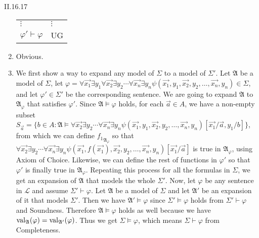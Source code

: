 \documentclass[12pt]{article}
\begin{document}
\begin{customthm}{II.16.17}
\begin{enumerate}
\begin{center}
\begin{tabular}{ll}
        $\vdots$ & $\vdots$ \\
        $\varphi'\vdash\varphi$ & UG \\
      \end{tabular}
    \end{center}
    \item Obvious.
    \item We first show a way to expand any model of $\Sigma$ to a model of $\Sigma'$. Let $\mathfrak{A}$ be a model of $\Sigma$, let $\varphi=\forall\vec{x_1}\exists y_1\forall\vec{x_2}\exists y_2\cdots\forall\vec{x_n}\exists y_n\psi(\vec{x_1},y_1,\vec{x_2},y_2,\ldots,\vec{x_n},y_n)\in\Sigma$, and let $\varphi'\in\Sigma'$ be the corresponding sentence. We are going to expand $\mathfrak{A}$ to $\mathfrak{A}_\varphi$ that satisfies $\varphi'$. Since $\mathfrak{A}\models\varphi$ holds, for each $\vec{a}\in A$, we have a non-empty subset $S_{\vec{a}}=\{b\in A:\mathfrak{A}\models\forall\vec{x_2}\exists y_2\cdots\forall\vec{x_n}\exists y_n\psi(\vec{x_1},y_1,\vec{x_2},y_2,\ldots,\vec{x_n},y_n)[\vec{x_1}/\vec{a},y_1/b]\}$, from which we can define ${f_1}_{\mathfrak{A}_\varphi}$ so that $\forall\vec{x_2}\exists y_2\cdots\forall\vec{x_n}\exists y_n\psi(\vec{x_1},f(\vec{x_1}),\vec{x_2},y_2,\ldots,\vec{x_n},y_n)[\vec{x_1}/\vec{a}]$ is true in $\mathfrak{A}_\varphi$, using Axiom of Choice. Likewise, we can define the rest of functions in $\varphi'$ so that $\varphi'$ is finally true in $\mathfrak{A}_\varphi$. Repeating this process for all the formulas in $\Sigma$, we get an expansion of $\mathfrak{A}$ that models the whole $\Sigma'$. Now, let $\varphi$ be any sentence in $\mathcal{L}$ and assume $\Sigma'\vdash\varphi$. Let $\mathfrak{A}$ be a model of $\Sigma$ and let $\mathfrak{A}'$ be an expansion of it that models $\Sigma'$. Then we have $\mathfrak{A}'\models\varphi$ since $\Sigma'\models\varphi$ holds from $\Sigma'\vdash\varphi$ and Soundness. Therefore $\mathfrak{A}\models\varphi$ holds as well because we have $\mathop{\mathrm{val}}_\mathfrak{A}(\varphi)=\mathop{\mathrm{val}}_{\mathfrak{A}'}(\varphi)$. Thus we get $\Sigma\models\varphi$, which means $\Sigma\vdash\varphi$ from Completeness.
  \end{enumerate}
\end{customthm}
\end{document}
